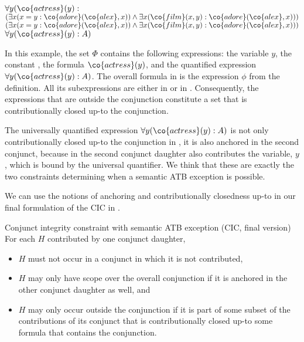 \documentclass[output=paper]{langsci/langscibook}
\begin{document}
\ea
\begin{xlist}
\ex 
$\forall y (\co{actress}(y) :$\\
\hspace*{\fill}
$(\exists x (x = y : \co{adore}(\co{alex},x)) \land \exists x (\co{film}(x,y) : \co{adore}(\co{alex},x)))$ \label{ex-phi}
%
\ex $(\exists x (x = y : \co{adore}(\co{alex},x)) \land \exists x (\co{film}(x,y) : \co{adore}(\co{alex},x)))$
\label{ex-psi}
\ex $\forall y (\co{actress}(y) : A)$
\label{ex-PHI}
\end{xlist}
\z 

In this example, the set $\Phi$ contains the following expressions: the variable $y$, the constant , the formula $\co{actress}(y)$, and the quantified expression $\forall y (\co{actress}(y): A)$. 
The overall formula in  is the expression $\phi$ from the definition. 
All its subexpressions are either in  or in .
Consequently, the expressions that are outside the conjunction constitute a set that is contributionally closed up-to the conjunction.

The universally quantified expression $\forall y (\co{actress}(y) : A)$ is not only contributionally closed up-to the conjunction in , it is also anchored in the second conjunct, because  in the second conjunct daughter also contributes the variable, $y$, which is bound by the universal quantifier.
We think that these are exactly the two constraints determining when a semantic ATB exception is possible.

We can use the notions of anchoring and contributionally closedness up-to in our final formulation of 
the CIC in . 

\ea 
Conjunct integrity constraint with semantic ATB exception (CIC, final version)\label{SemATB2}\\
For each $H$ contributed by one conjunct daughter, 
\begin{itemize}
    \item  $H$ must not occur in a conjunct in which it is not contributed,
    \item $H$ may only have scope over the overall conjunction if it is anchored in the other conjunct daughter as well, and
    \item $H$ may only occur outside the conjunction if it is part of some subset of the contributions of its conjunct that is contributionally closed up-to some formula that contains the conjunction.
\end{itemize}
\z 
\end{document}
